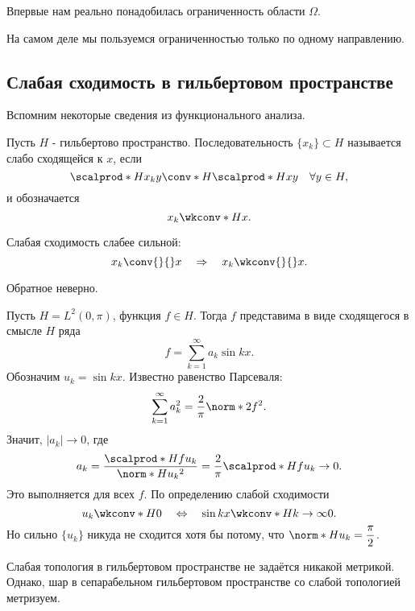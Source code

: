 \begin{note}
Впервые нам реально понадобилась ограниченность области $\Omega$.
\end{note}

\begin{note}
На самом деле мы пользуемся ограниченностью только по одному направлению. 
\end{note}

\subsection{Слабая сходимость в гильбертовом пространстве}
Вспомним некоторые сведения из функционального анализа.
\begin{definition}
Пусть $H$ - гильбертово пространство. Последовательность $\{x_k \} \subset H$ называется слабо сходящейся к $x$, если
$$\scalprod*{H}{x_k}{y} \conv*{H}{} \scalprod*{H}{x}{y} \quad \forall y \in H,$$
и обозначается
$$ x_k \wkconv*{H}{} x.$$
\end{definition}

\begin{note}
Слабая сходимость слабее сильной:
$$ x_k \conv{}{} x \quad \Rightarrow \quad x_k \wkconv{}{} x.$$
\end{note}

\begin{note}
Обратное неверно.
\end{note}

\begin{example} Пусть $H = L^2(0, \pi)$, функция $f \in H$. Тогда $f$ представима в виде сходящегося в смысле $H$ ряда
$$ f = \sum_{k=1}^\infty a_k \sin kx.$$
Обозначим $u_k = \sin kx$. Известно равенство Парсеваля:
$$ \sum_{k=1}^\infty a_k^2 = \frac {2} {\pi} \norm*{2}{f}^2.$$
Значит, $|a_k| \to 0$, где
$$ a_k = \frac {\scalprod*{H}{f}{u_k}} {\norm*{H}{u_k}^2} = \frac {2} {\pi} \scalprod*{H}{f}{u_k} \to 0.$$
Это выполняется для всех $f$. По определению слабой сходимости
$$ u_k \wkconv*{H}{} 0 \quad \Leftrightarrow \quad \sin kx \wkconv*{H}{k \to \infty} 0.$$
Но сильно $\{ u_k \}$ никуда не сходится хотя бы потому, что $\displaystyle \norm*{H}{u_k} = \frac {\pi} {2}$.
\end{example}

\begin{note}
Слабая топология в гильбертовом пространстве не задаётся никакой метрикой. Однако, шар в сепарабельном гильбертовом пространстве со слабой топологией метризуем.
\end{note}

